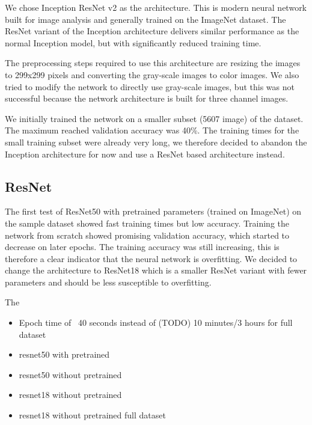 We chose Inception ResNet v2 \cite{szegedy2017inception} as the architecture. This is modern neural network built for image analysis and generally trained on the ImageNet dataset.
The ResNet variant of the Inception architecture delivers similar performance as the normal Inception model, but with significantly reduced training time.

The preprocessing steps required to use this architecture are resizing the images to 299x299 pixels and converting the gray-scale images to color images.
We also tried to modify the network to directly use gray-scale images, but this was not successful because the network architecture is built for three channel images.

We initially trained the network on a smaller subset (5607 image) of the dataset. The maximum reached validation accuracy was 40\%. The training times for the small training subset
were already very long, we therefore decided to abandon the Inception architecture for now and use a ResNet based architecture instead.

\subsection{ResNet}

The first test of ResNet50 \cite{he2016deep} with pretrained parameters (trained on ImageNet) on the sample dataset showed fast training times but low accuracy. Training the network from scratch showed promising validation accuracy, which started to decrease on later epochs. The training accuracy was still increasing, this is therefore a clear indicator that the neural network is overfitting. We decided to change the architecture to ResNet18 which is a smaller ResNet variant with fewer parameters and should be less susceptible to overfitting.

The 

\begin{itemize}
    \item Epoch time of ~40 seconds instead of (TODO) 10 minutes/3 hours for full dataset
    \item resnet50 with pretrained
    \item resnet50 without pretrained
    \item resnet18 without pretrained
    \item resnet18 without pretrained full dataset
\end{itemize}




